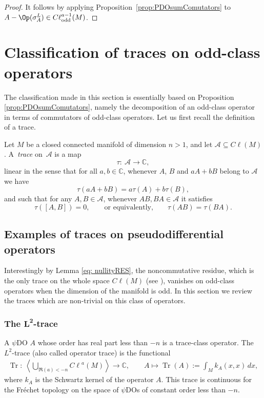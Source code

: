 \documentclass[pdftex]{sigma}
\DeclareMathOperator{\Tr}{Tr} \DeclareMathOperator{\ord}{ord}
\DeclareMathOperator{\odd}{odd} \DeclareMathOperator{\supp}{supp}
\newcommand{\C}{{\mathbb C}}
\def \Cl {{C\ell}}
\begin{document}
\begin{proof}
It follows by applying Proposition~\ref{prop:PDOsumComutators} to $A-\Op(\sigma_A^L)\in \Cl^{a-1}_{\odd}(M)$.
\end{proof}

\section{Classif\/ication of traces on odd-class operators}\label{sectiontraces}

The classif\/ication made in this section is essentially based on Proposition \ref{prop:PDOsumComutators}, namely the decomposition of an odd-class operator in terms of commutators of odd-class operators. Let us f\/irst recall the def\/inition of a trace.

Let $M$ be a closed connected manifold of dimension $n>1$, and let $\mathcal{A}\subseteq\Cl(M)$. A~\emph{trace} on~$\mathcal{A}$ is a map
\[
\tau: \ \mathcal{A}\rightarrow\mathbb{C},
\]
linear in the sense that for all $a, b\in\C$, whenever $A$, $B$ and $aA+bB$ belong to $\mathcal{A}$ we have
\[
\tau(aA+bB)=a \tau(A)+b \tau(B),
\]
and such that for any $A,B\in\mathcal{A}$, whenever $AB,BA\in\mathcal{A}$ it satisf\/ies
\[
\tau([A,B])=0,\qquad \text{or equivalently,} \qquad \tau(AB)=\tau(BA).
\]

\subsection{Examples of traces on pseudodif\/ferential operators}

Interestingly by Lemma \ref{eq: nullityRES}, the noncommutative residue, which is the only trace on the whole space $\Cl(M)$ (see \cite{fedosov,lesch,wodzicki}), vanishes on odd-class operators when the dimension of the manifold is odd. In this section we review the traces which are non-trivial on this class of operators.

\subsubsection[The $L^2$-trace]{The $\boldsymbol{L^2}$-trace}\label{sectionL2trace}

A $\psi$DO $A$ whose order has real part less than $-n$ is a trace-class operator. The $L^2$-trace (also called operator trace) is the functional
\begin{gather}
\Tr:\ \left\langle\bigcup\limits_{\Re(a)<-n}\Cl^{a}(M)\right\rangle \to\mathbb{C},\qquad
A \mapsto\Tr(A):=\int_{M}k_A(x,x)\,dx, \label{TrL2kernel}
\end{gather}
where $k_A$ is the Schwartz kernel of the operator $A$. This trace is continuous for the Fr\'echet topology on the space of $\psi$DOs of constant order less than $-n$.
\end{document}
